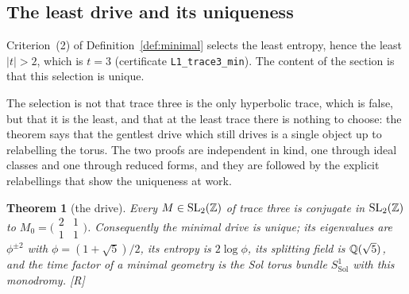 \documentclass[11pt,a4paper]{article}
\theoremstyle{plain}
\newtheorem{theorem}{Theorem}[section]
\theoremstyle{definition}
\theoremstyle{remark}
\newcommand{\Sol}{\mathrm{Sol}}
\newcommand{\rigR}{[\textup{R}]}
\begin{document}
\subsection{The least drive and its uniqueness}

Criterion~(2) of Definition~\ref{def:minimal} selects the least entropy, hence the least $\lvert t\rvert>2$, which is $t=3$ (certificate \texttt{L1\_trace3\_min}). The content of the section is that this selection is unique.

The selection is not that trace three is the only hyperbolic trace, which is false, but that it is the least, and that at the least trace there is nothing to choose: the theorem says that the gentlest drive which still drives is a single object up to relabelling the torus. The two proofs are independent in kind, one through ideal classes and one through reduced forms, and they are followed by the explicit relabellings that show the uniqueness at work.

\begin{theorem}[the drive]\label{thm:drive}
Every $M\in\mathrm{SL}_{2}(\mathbb{Z})$ of trace three is conjugate in $\mathrm{SL}_{2}(\mathbb{Z})$ to $M_{0}=\bigl(\begin{smallmatrix}2&1\\1&1\end{smallmatrix}\bigr)$. Consequently the minimal drive is unique; its eigenvalues are $\phi^{\pm2}$ with $\phi=(1+\sqrt5)/2$, its entropy is $2\log\phi$, its splitting field is $\mathbb{Q}(\sqrt5)$, and the time factor of a minimal geometry is the Sol torus bundle $S^{1}_{\Sol}$ with this monodromy. \rigR
\end{theorem}
\end{document}

